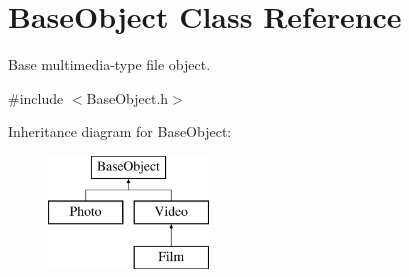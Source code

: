 \hypertarget{classBaseObject}{\section{Base\-Object Class Reference}
\label{classBaseObject}
}


Base multimedia-\/type file object.  




{\ttfamily \#include $<$Base\-Object.\-h$>$}

Inheritance diagram for Base\-Object\-:\begin{figure}[H]
\begin{center}
\leavevmode
\includegraphics[height=3.000000cm]{classBaseObject}
\end{center}
\end{figure}
